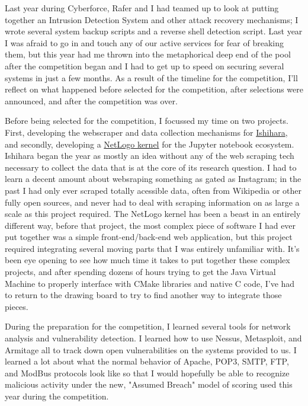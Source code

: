 



Last year during Cyberforce, Rafer and I had teamed up to look at putting together an Intrusion Detection System and other attack recovery mechanisms; I wrote several system backup scripts and a reverse shell detection script. Last year I was afraid to go in and touch any of our active services for fear of breaking them, but this year had me thrown into the metaphorical deep end of the pool after the competition began and I had to get up to speed on securing several systems in just a few months. As a result of the timeline for the competition, I'll reflect on what happened before selected for the competition, after selections were announced, and after the competition was over.

\vspace{7mm}

Before being selected for the competition, I focussed my time on two projects. First, developing the webscraper and data collection mechanisms for \href{https://uwcedar.io/Research/quirk/ishihara}{Ishihara}, and secondly, developing a \href{https://uwcedar.io/andey-robins/netlogopyter-notebook}{NetLogo kernel} for the Jupyter notebook ecosystem. Ishihara began the year as mostly an idea without any of the web scraping tech necessary to collect the data that is at the core of its research question. I had to learn a decent amount about websraping something as gated as Instagram; in the past I had only ever scraped totally acessible data, often from Wikipedia or other fully open sources, and never had to deal with scraping information on as large a scale as this project required. The NetLogo kernel has been a beast in an entirely different way, before that project, the most complex piece of software I had ever put together was a simple front-end/back-end web application, but this project required integrating several moving parts that I was entirely unfamiliar with. It's been eye opening to see how much time it takes to put together these complex projects, and after spending dozens of hours trying to get the Java Virtual Machine to properly interface with CMake libraries and native C code, I've had to return to the drawing board to try to find another way to integrate those pieces.

\vspace{7mm}

During the preparation for the competition, I learned several tools for network analysis and vulnerability detection. I learned how to use Nessus, Metasploit, and Armitage all to track down open vulnerabilities on the systems provided to us. I learned a lot about what the normal behavior of Apache, POP3, SMTP, FTP, and ModBus protocols look like so that I would hopefully be able to recognize malicious activity under the new, "Assumed Breach" model of scoring used this year during the competition.

